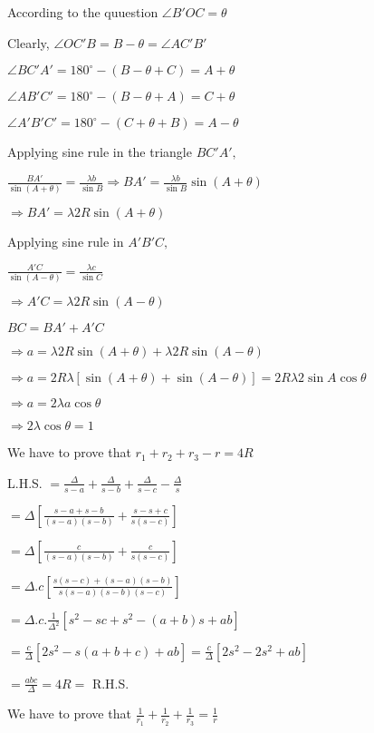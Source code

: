   According to the quuestion $\angle B'OC=\theta$

  Clearly, $\angle OC'B = B - \theta = \angle AC'B'$

  $\angle BC'A' = 180^\circ - (B - \theta + C) = A + \theta$

  $\angle AB'C' = 180^\circ - (B - \theta + A) = C + \theta$

  $\angle A'B'C' = 180^\circ - (C + \theta + B) = A - \theta$

  Applying sine rule in the triangle $BC'A',$

  $\frac{BA'}{\sin(A +\theta)} = \frac{\lambda b}{\sin B}\Rightarrow BA' = \frac{\lambda b}{\sin B}\sin(A + \theta)$

  $\Rightarrow BA' = \lambda 2R\sin(A + \theta)$

  Applying sine rule in $A'B'C,$

  $\frac{A'C}{\sin(A - \theta)} = \frac{\lambda c}{\sin C}$

  $\Rightarrow A'C = \lambda 2R\sin(A - \theta)$

  $BC = BA' + A'C$

  $\Rightarrow a = \lambda 2R\sin(A + \theta) + \lambda 2R\sin(A - \theta)$

  $\Rightarrow a = 2R\lambda[\sin(A + \theta) + \sin(A - \theta)] = 2R\lambda 2\sin A\cos\theta$

  $\Rightarrow a = 2\lambda a\cos\theta$

  $\Rightarrow 2\lambda\cos\theta = 1$

\item We have to prove that $r_1 + r_2 + r_3 - r = 4R$

  L.H.S. $= \frac{\Delta}{s - a} + \frac{\Delta}{s - b} + \frac{\Delta}{s - c} - \frac{\Delta}{s}$

  $= \Delta\left[\frac{s - a + s - b}{(s - a)(s - b)} + \frac{s - s + c}{s(s - c)}\right]$

  $=\Delta\left[\frac{c}{(s - a)(s - b)} + \frac{c}{s(s - c)}\right]$

  $=\Delta.c \left[\frac{s(s - c) + (s - a)(s - b)}{s(s - a)(s - b)(s - c)}\right]$

  $=\Delta.c.\frac{1}{\Delta^2}[s^2 - sc + s^2 - (a + b)s + ab]$

  $=\frac{c}{\Delta}[2s^2 - s(a + b + c) + ab] = \frac{c}{\Delta}[2s^2 - 2s^2 + ab]$

  $= \frac{abc}{\Delta} = 4R =$ R.H.S.

\item We have to prove that $\frac{1}{r_1} + \frac{1}{r_2} + \frac{1}{r_3} = \frac{1}{r}$


